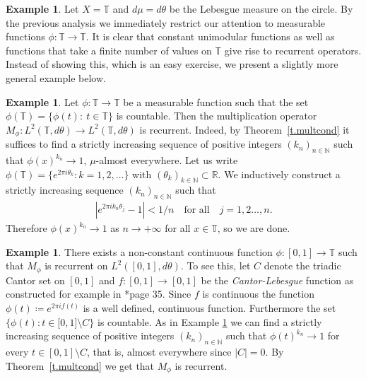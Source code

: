 \documentclass[12pt,leqno]{amsart}
\theoremstyle{plain}
\theoremstyle{definition}
\newtheorem{example}[equation]{Example}
\numberwithin{equation}{section}
\begin{document}
\begin{example}
	Let $X=\mathbb T$ and $d\mu=d\theta$ be the Lebesgue measure on the circle. By the previous analysis we immediately restrict our attention to measurable functions $\phi:\mathbb T\to \mathbb T$. It is clear that constant unimodular functions as well as functions that take a finite number of values on $\mathbb T$ give rise to recurrent operators. Instead of showing this, which is an easy exercise, we present a slightly more general example below. 
\end{example}

\begin{example}
	\label{e.countable} Let $\phi:\mathbb T\to \mathbb T$ be a measurable function such that the set $\phi(\mathbb T)=\{\phi(t):\ t\in\mathbb T\}$ is countable. Then the multiplication operator $M_\phi:L^2(\mathbb T,d\theta)\to L^2(\mathbb T,d\theta)$ is recurrent. Indeed, by Theorem~\ref{t.multcond} it suffices to find a strictly increasing sequence of positive integers $(k_n)_{n\in \mathbb N}$ such that $\phi(x)^{k_n}\to 1$, $\mu$-almost everywhere. Let us write $\phi(\mathbb T)=\{e^{2\pi i \theta_k}: k=1,2,\ldots \}$ with $(\theta_k)_{k\in\mathbb N}\subset {\mathbb R}$. We inductively construct a strictly increasing sequence $(k_n)_{n\in\mathbb N}$ such that 
	\begin{align*}
		|e^{2\pi i k_n\theta_j}-1|<1/n\quad\text{for all}\quad j=1,2\ldots,n. 
	\end{align*}
	Therefore $\phi(x)^{k_n}\to 1$ as $n\to +\infty$ for all $x\in\mathbb T$, so we are done. 
\end{example}

\begin{example}
	There exists a non-constant continuous function $\phi:[0,1] \to \mathbb T$ such that $M_\phi$ is recurrent on $L^2([0,1],d\theta)$. To see this, let $C$ denote the triadic Cantor set on $[0,1]$ and $f:[0,1]\to [0,1]$ be the \emph{Cantor-Lebesgue} function as constructed for example in \cite{WZ}*{page 35}. Since $f$ is continuous the function $\phi(t)\coloneqq e^{2\pi if(t)}$ is a well defined, continuous function. Furthermore the set $\{\phi(t):t\in\mathbb [0,1]\setminus C\}$ is countable. As in Example \ref{e.countable} we can find a strictly increasing sequence of positive integers $(k_n)_{n\in\mathbb N}$ such that $\phi(t)^{k_n}\to 1$ for every $t\in [0,1]\setminus C$, that is, almost everywhere since $|C|=0$. By Theorem~\ref{t.multcond} we get that $M_\phi$ is recurrent. 
\end{example}
\end{document}
